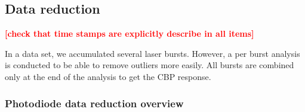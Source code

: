 \documentclass[onecolumn]{aa}
\newcommand{\todo}[1]{\textbf{\textcolor{red}{[#1]}}\xspace}
\begin{document}

%
%
%
%
%
%


%
%



\subsection{Data reduction}

\todo{check that time stamps are explicitly describe in all items}

In a data set, we accumulated several laser bursts. However, a per burst analysis is conducted to be able to remove outliers more easily. All bursts are combined only at the end of the analysis to get the CBP response.

\subsubsection{Photodiode data reduction overview}
\end{document}
